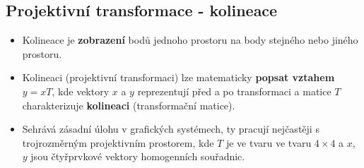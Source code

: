 \subsection{Projektivní transformace - kolineace}
\begin{itemize}
	\item Kolineace je \textbf{zobrazení} bodů jednoho prostoru na body stejného nebo jiného prostoru.
	\item Kolineaci (projektivní transformaci) lze matematicky \textbf{popsat vztahem} $y = xT$, kde vektory $x$ a $y$ reprezentují před a po transformaci a matice $T$ charakterizuje \textbf{kolineaci} (transformační matice).
	\item Sehrává zásadní úlohu v grafických systémech, ty pracují nejčastěji s trojrozměrným projektivním prostorem, kde $T$ je ve tvaru  ve tvaru $4\times4$ a $x$, $y$ jsou čtyřprvkové vektory homogenních souřadnic.
\end{itemize}

